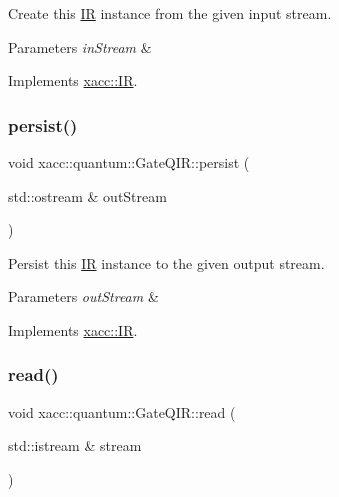 Create this \hyperlink{a02480}{IR} instance from the given input stream.


\begin{DoxyParams}{Parameters}
{\em in\+Stream} & \\
\hline
\end{DoxyParams}


Implements \hyperlink{a02480_a444c2e4dc0faac500fb70fa93997e9bc}{xacc\+::\+IR}.

\mbox{\label{a01296_a40e1d07e4dfd3794ef53fca3cdbdca61}} 
\subsubsection{\texorpdfstring{persist()}{persist()}}
{\footnotesize\ttfamily void xacc\+::quantum\+::\+Gate\+Q\+I\+R\+::persist (\begin{DoxyParamCaption}\item[{std\+::ostream \&}]{out\+Stream }\end{DoxyParamCaption})\hspace{0.3cm}{\ttfamily [virtual]}}

Persist this \hyperlink{a02480}{IR} instance to the given output stream.


\begin{DoxyParams}{Parameters}
{\em out\+Stream} & \\
\hline
\end{DoxyParams}


Implements \hyperlink{a02480_a414b72224d88473ad6190bb88102a3ea}{xacc\+::\+IR}.

\mbox{\label{a01296_a26019e2f1e13e64645e29aee86ac58b1}} 
\subsubsection{\texorpdfstring{read()}{read()}}
{\footnotesize\ttfamily void xacc\+::quantum\+::\+Gate\+Q\+I\+R\+::read (\begin{DoxyParamCaption}\item[{std\+::istream \&}]{stream }\end{DoxyParamCaption})\hspace{0.3cm}{\ttfamily [virtual]}}

